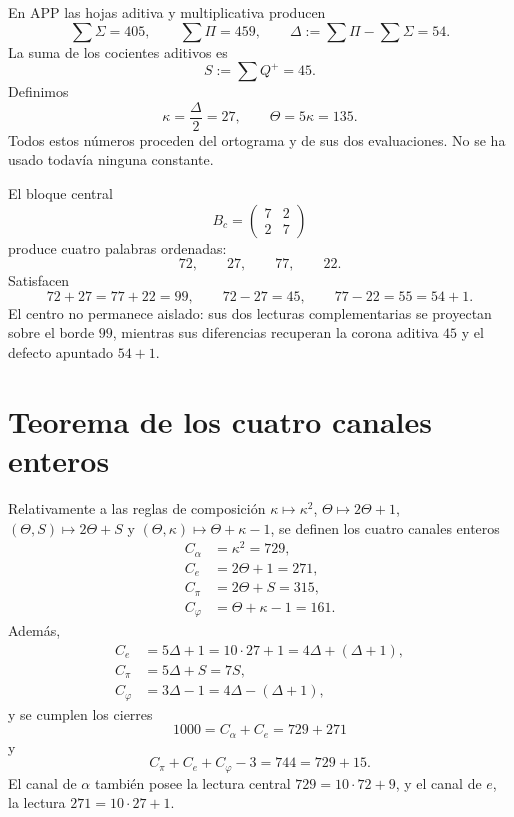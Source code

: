 En APP las hojas aditiva y multiplicativa producen
\[
 \sum\Sigma=405,
 \qquad
 \sum\Pi=459,
 \qquad
 \Delta:=\sum\Pi-\sum\Sigma=54.
\]
La suma de los cocientes aditivos es
\[
 S:=\sum Q^+=45.
\]
Definimos
\[
 \kappa=\frac{\Delta}{2}=27,
 \qquad
 \Theta=5\kappa=135.
\]
Todos estos números proceden del ortograma y de sus dos evaluaciones. No se
ha usado todavía ninguna constante.

El bloque central
\[
 B_c=\begin{pmatrix}7&2\\2&7\end{pmatrix}
\]
produce cuatro palabras ordenadas:
\[
 72,\qquad27,\qquad77,\qquad22.
\]
Satisfacen
\[
 72+27=77+22=99,
 \qquad
 72-27=45,
 \qquad
 77-22=55=54+1.
\]
El centro no permanece aislado: sus dos lecturas complementarias se
proyectan sobre el borde \(99\), mientras sus diferencias recuperan la
corona aditiva \(45\) y el defecto apuntado \(54+1\).

\section{Teorema de los cuatro canales enteros}

\begin{theorem}
\label{thm:derivacion-canales-enteros}
Relativamente a las reglas de composición
\(\kappa\mapsto\kappa^2\), \(\Theta\mapsto2\Theta+1\),
\((\Theta,S)\mapsto2\Theta+S\) y
\((\Theta,\kappa)\mapsto\Theta+\kappa-1\), se definen los cuatro canales
enteros
\[
\begin{aligned}
 C_\alpha&=\kappa^2=729,\\
 C_e&=2\Theta+1=271,\\
 C_\pi&=2\Theta+S=315,\\
 C_\varphi&=\Theta+\kappa-1=161.
\end{aligned}
\]
Además,
\[
\begin{aligned}
 C_e&=5\Delta+1=10\cdot27+1
      =4\Delta+(\Delta+1),\\
 C_\pi&=5\Delta+S=7S,\\
 C_\varphi&=3\Delta-1
      =4\Delta-(\Delta+1),
\end{aligned}
\]
y se cumplen los cierres
\[
 \boxed{1000=C_\alpha+C_e=729+271}
\]
y
\[
 \boxed{C_\pi+C_e+C_\varphi-3=744=729+15.}
\]
El canal de \(\alpha\) también posee la lectura central
\(729=10\cdot72+9\), y el canal de \(e\), la lectura
\(271=10\cdot27+1\).
\end{theorem}

